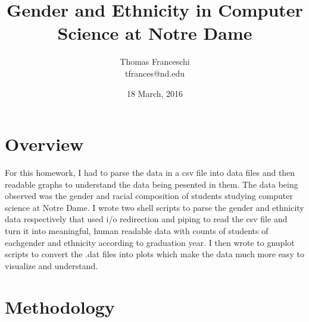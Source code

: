 \documentclass{article}
\title{Gender and Ethnicity in Computer Science at Notre Dame}
\date{18 March, 2016}
\author{Thomas Franceschi \\ tfrances@nd.edu}
\begin{document}
\maketitle


\section*{Overview}

For this homework, I had to parse the data in a csv file into data files and then readable graphs to understand the data 
being pesented in them. The data being observed was the gender and racial composition of students 
studying computer science at Notre Dame. I wrote two shell scripts to parse the gender and ethnicity data 
respectively that used i/o redirection and piping to read the csv file and turn it into meaningful, human 
readable data with counts of students of eachgender and ethnicity according to graduation year. I then wrote to 
gnuplot scripts to convert the .dat files into plots which make the data much more easy to visualize and understand.

\section*{Methodology}
\end{document}
